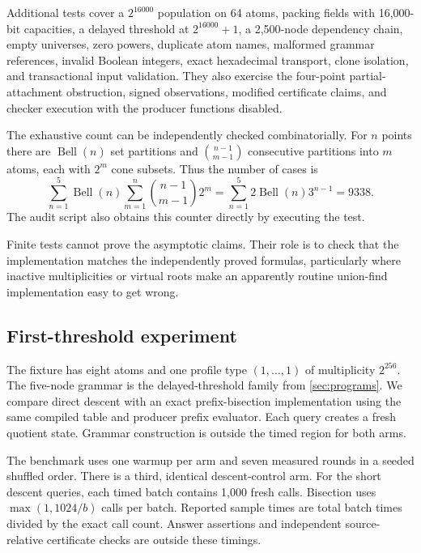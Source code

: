 Additional tests cover a $2^{16000}$ population on 64 atoms, packing fields
with 16,000-bit capacities, a delayed threshold at $2^{16000}+1$, a
2,500-node dependency chain, empty universes, zero powers, duplicate atom
names, malformed grammar references, invalid Boolean integers, exact
hexadecimal transport, clone isolation, and transactional input validation.
They also exercise the four-point partial-attachment obstruction, signed
observations, modified certificate claims, and checker execution with the
producer functions disabled.

The exhaustive count can be independently checked combinatorially. For $n$
points there are $\operatorname{Bell}(n)$ set partitions and
$\binom{n-1}{m-1}$ consecutive partitions into $m$ atoms, each with $2^m$
cone subsets. Thus the number of cases is
\[
 \sum_{n=1}^{5}\operatorname{Bell}(n)
 \sum_{m=1}^{n}\binom{n-1}{m-1}2^m
 =\sum_{n=1}^{5}2\operatorname{Bell}(n)3^{n-1}=9338.
\]
The audit script also obtains this counter directly by executing the test.

Finite tests cannot prove the asymptotic claims. Their role is to check
that the implementation matches the independently proved formulas,
particularly where inactive multiplicities or virtual roots make an
apparently routine union-find implementation easy to get wrong.

\subsection{First-threshold experiment}

The fixture has eight atoms and one profile type $(1,\ldots,1)$ of
multiplicity $2^{256}$. The five-node grammar is the delayed-threshold
family from \cref{sec:programs}. We compare direct descent with an exact
prefix-bisection implementation using the same compiled table and producer
prefix evaluator. Each query creates a fresh quotient state. Grammar
construction is outside the timed region for both arms.



The benchmark uses one warmup per arm and seven measured rounds in a
seeded shuffled order. There is a third, identical descent-control arm.
For the short descent queries, each timed batch contains 1,000 fresh calls.
Bisection uses $\max(1,1024/b)$ calls per batch. Reported sample times are
total batch times divided by the exact call count. Answer assertions and
independent source-relative certificate checks are outside these timings.

